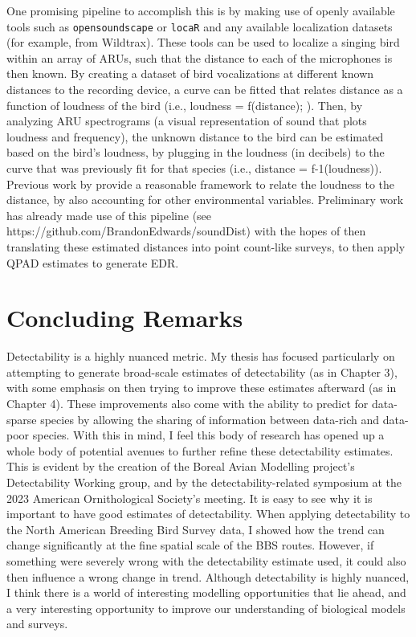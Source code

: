 \par One promising pipeline to accomplish this is by making use of openly available tools such as \texttt{opensoundscape} \citep{lapp_opensoundscape_2023} or \texttt{locaR} \citep{becker_locar_2023} and any available localization datasets (for example, from Wildtrax).
These tools can be used to localize a singing bird within an array of ARUs, such that the distance to each of the microphones is then known.
By creating a dataset of bird vocalizations at different known distances to the recording device, a curve can be fitted that relates distance as a function of loudness of the bird (i.e., loudness = f(distance); \citet{sebastian-gonzalez_density_2018, yip_sound_2020}). 
Then, by analyzing ARU spectrograms (a visual representation of sound that plots loudness and frequency), the unknown distance to the bird can be estimated based on the bird’s loudness, by plugging in the loudness (in decibels) to the curve that was previously fit for that species (i.e., distance = f-1(loudness)). 
Previous work by \citet{haupert_physicsbased_2023} provide a reasonable framework to relate the loudness to the distance, by also accounting for other environmental variables.
Preliminary work has already made use of this pipeline (see https://github.com/BrandonEdwards/soundDist) with the hopes of then translating these estimated distances into point count-like surveys, to then apply QPAD estimates to generate EDR.


\section{Concluding Remarks}
\par Detectability is a highly nuanced metric.
My thesis has focused particularly on attempting to generate broad-scale estimates of detectability (as in Chapter 3), with some emphasis on then trying to improve these estimates afterward (as in Chapter 4).
These improvements also come with the ability to predict for data-sparse species by allowing the sharing of information between data-rich and data-poor species.
With this in mind, I feel this body of research has opened up a whole body of potential avenues to further refine these detectability estimates.
This is evident by the creation of the Boreal Avian Modelling project's Detectability Working group, and by the detectability-related symposium at the 2023 American Ornithological Society's meeting.
It is easy to see why it is important to have good estimates of detectability.
When applying detectability to the North American Breeding Bird Survey data, I showed how the trend can change significantly at the fine spatial scale of the BBS routes.
However, if something were severely wrong with the detectability estimate used, it could also then influence a wrong change in trend.
Although detectability is highly nuanced, I think there is a world of interesting modelling opportunities that lie ahead, and a very interesting opportunity to improve our understanding of biological models and surveys.

